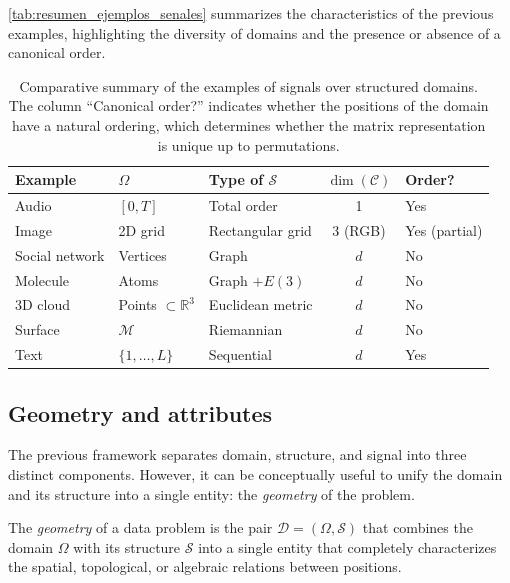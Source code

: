 \autoref{tab:resumen_ejemplos_senales} summarizes the characteristics of the previous examples, highlighting the diversity of domains and the presence or absence of a canonical order.

\begin{table}[htbp]
\centering
\caption[Summary of examples of signals over structured domains]{Comparative summary of the examples of signals over structured domains. The column ``Canonical order?'' indicates whether the positions of the domain have a natural ordering, which determines whether the matrix representation is unique up to permutations.}
\label{tab:resumen_ejemplos_senales}
\begin{tabular}{lllcl}
\toprule
\textbf{Example} & $\Omega$ & \textbf{Type of} $\mathcal{S}$ & $\dim(\mathcal{C})$ & \textbf{Order?} \\
\midrule
Audio & $[0,T]$ & Total order & 1 & Yes \\
Image & 2D grid & Rectangular grid & 3 (RGB) & Yes (partial) \\
Social network & Vertices & Graph & $d$ & No \\
Molecule & Atoms & Graph $+ E(3)$ & $d$ & No \\
3D cloud & Points $\subset \mathbb{R}^3$ & Euclidean metric & $d$ & No \\
Surface & $\mathcal{M}$ & Riemannian & $d$ & No \\
Text & $\{1,\ldots,L\}$ & Sequential & $d$ & Yes \\
\bottomrule
\end{tabular}
\end{table}

\subsection{Geometry and attributes}\label{sec:geometria_atributos}

The previous framework separates domain, structure, and signal into three distinct components. However, it can be conceptually useful to unify the domain and its structure into a single entity: the \textit{geometry} of the problem.

\begin{definition}\label{def:geometria_dominio}
The \textit{geometry} of a data problem is the pair $\mathcal{D} = (\Omega, \mathcal{S})$ that combines the domain $\Omega$ with its structure $\mathcal{S}$ into a single entity that completely characterizes the spatial, topological, or algebraic relations between positions.
\end{definition}

